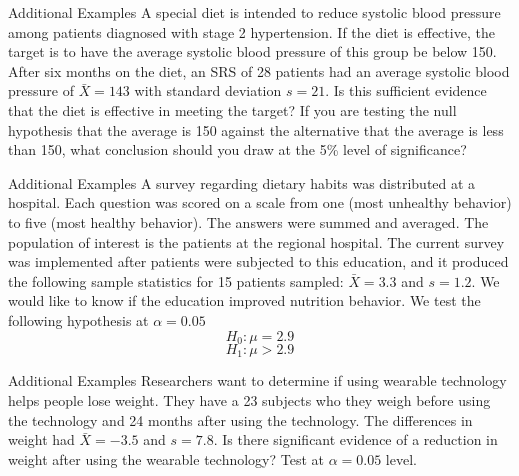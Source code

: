 \documentclass{beamer}
\begin{document}
\begin{frame}{Additional Examples}
	A special diet is intended to reduce systolic blood pressure among patients diagnosed with stage 2 hypertension. If the diet is effective, the target is to have the average systolic blood pressure of this group be below 150. After six months on the diet, an SRS of 28 patients had an average systolic blood pressure of $\bar{X} = 143$ with standard deviation $s = 21$. Is this sufficient evidence that the diet is effective in meeting the target? If you are testing the null hypothesis that the average is 150 against the alternative that the average is less than 150, what conclusion should you draw at the 5\% level of significance?
\end{frame}


\begin{frame}{Additional Examples}
	A survey regarding dietary habits was distributed at a hospital. Each question was scored on a scale from one (most unhealthy behavior) to five (most healthy behavior). The answers were summed and averaged. The population of interest is the patients at the regional hospital. The current survey was implemented after patients were subjected to this education, and it produced the following sample statistics for 15 patients sampled: $\bar{X} = 3.3$ and $s = 1.2$. We would like to know if the education improved nutrition behavior. We test the following hypothesis at $\alpha = 0.05$
	\[ 
		H_0: \mu=2.9
	\]
	\[ 
		H_1: \mu>2.9
	\]
\end{frame}

\begin{frame}{Additional Examples}
	Researchers want to determine if using wearable technology helps people lose weight. They have a 23 subjects who they weigh before using the technology and 24 months after using the technology. The differences in weight had $\bar{X} = -3.5$ and $s = 7.8$. Is there significant evidence of a reduction in weight after using the wearable technology? Test at $\alpha = 0.05$ level.
\end{frame}
\end{document}
